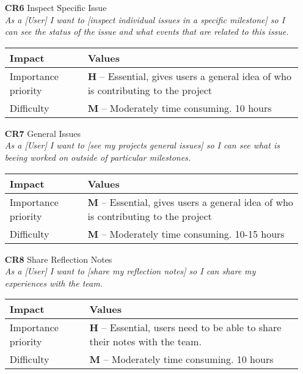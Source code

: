 \begin{itemize}
    \item[\textbf{CR6}] Inspect Specific Issue\\
        \textit{\small{As a [User] I want to [inspect individual issues in a specific milestone] so I can see the status of the issue and what events that are related to this issue.}}

        \begin{tabular}{| l | p{8cm} |}
            \hline
            \rowcolor[gray]{0.8}
            \textbf{Impact} & \textbf{Values} \\
            \hline
            Importance priority & \textbf{H} -- Essential, gives users a general idea of who is contributing to the project\\
            Difficulty & \textbf{M} -- Moderately time consuming. 10 hours\\
            \hline
        \end{tabular}
    \vspace{0.5cm}

    \item[\textbf{CR7}] General Issues\\
        \textit{\small{As a [User] I want to [see my projects general issues] so I can see what is beeing worked on outside of particular milestones.}}

        \begin{tabular}{| l | p{8cm} |}
            \hline
            \rowcolor[gray]{0.8}
            \textbf{Impact} & \textbf{Values} \\
            \hline
            Importance priority & \textbf{M} -- Essential, gives users a general idea of who is contributing to the project\\
            Difficulty & \textbf{M} -- Moderately time consuming. 10-15 hours\\
            \hline
        \end{tabular}
    \vspace{0.5cm}

    \item[\textbf{CR8}] Share Reflection Notes\\
        \textit{\small{As a [User] I want to [share my reflection notes] so I can share my experiences with the team.}}

        \begin{tabular}{| l | p{8cm} |}
            \hline
            \rowcolor[gray]{0.8}
            \textbf{Impact} & \textbf{Values} \\
            \hline
            Importance priority & \textbf{H} -- Essential, users need to be able to share their notes with the team.\\
            Difficulty & \textbf{M} -- Moderately time consuming. 10 hours\\
            \hline
        \end{tabular}
    \vspace{0.5cm}


\end{itemize}
